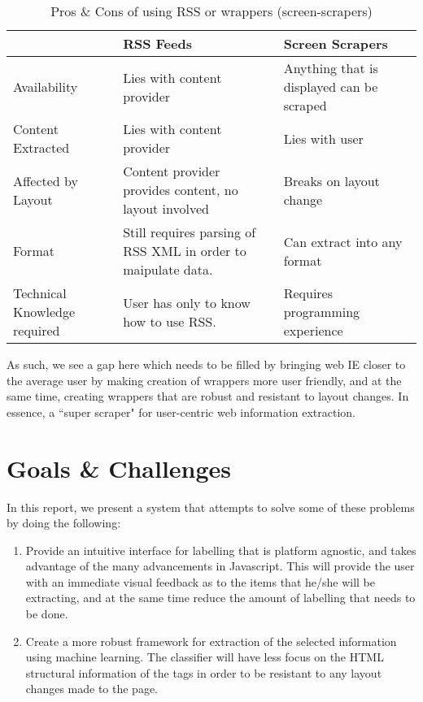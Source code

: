 \begin{table}[t]
\centering
\singlespacing
\small
\begin{tabular}{|p{3cm}|p{5cm}|p{5cm}|}
\hline
					&	RSS Feeds	&	Screen Scrapers \\
\hline
\hline
	Availability	&
	Lies with content provider &
	Anything that is displayed can be scraped \\
\hline
	Content Extracted &
	Lies with content provider &
	Lies with user \\
\hline
	Affected by Layout &
	Content provider provides content, no layout involved &
	Breaks on layout change \\
\hline
	Format &
	Still requires parsing of RSS XML in order to maipulate data. &
	Can extract into any format \\
\hline
	Technical Knowledge required &
	User has only to know how to use RSS. &
	Requires programming experience \\
	\hline
\end{tabular}
\caption{Pros \& Cons of using RSS or wrappers (screen-scrapers)}
\label{tab:template}
\end{table}


As such, we see a gap here which needs to be filled by bringing web IE closer to the average
user by making creation of wrappers more user friendly, and at the same time, creating wrappers
that are robust and resistant to layout changes. In essence, a ``super scraper" for
user-centric web information extraction.

\section{Goals \& Challenges}
In this report, we present a system that attempts to solve some of these problems by doing the
following:
	\begin{enumerate}
		\item Provide an intuitive interface for labelling that is platform agnostic, and takes
		 advantage of the many advancements in Javascript. This will provide the user with an
		 immediate visual feedback as to the items that he/she will be extracting, and at the
		 same time reduce the amount of labelling that needs to be done.
		\item Create a more robust framework for extraction of the selected information using
		machine learning. The classifier will have less focus on the HTML structural
		information of the tags in order to be resistant to any layout changes made to the page.
	\end{enumerate}

